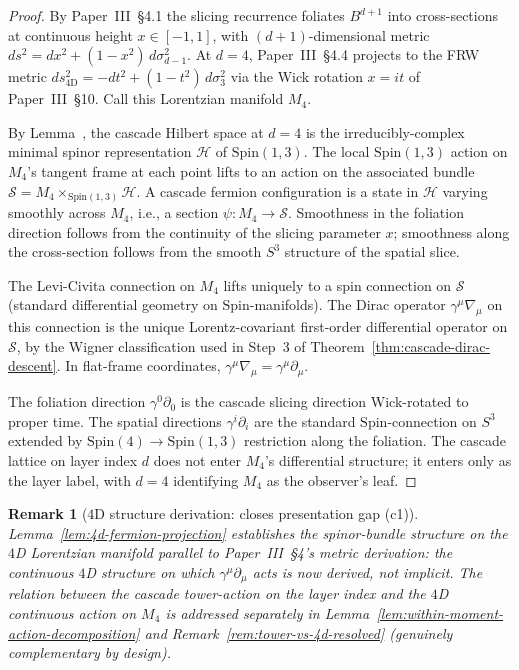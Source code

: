\documentclass[12pt,a4paper]{article}
\newtheorem*{remark}{Remark}
\begin{document}
\begin{proof}
By Paper~III~\S4.1 the slicing recurrence foliates $B^{d+1}$ into
cross-sections at continuous height $x \in [-1, 1]$, with
$(d+1)$-dimensional metric $ds^2 = dx^2 + (1-x^2)\,d\sigma_{d-1}^2$.
At $d=4$, Paper~III~\S4.4 projects to the FRW metric
$ds^2_{4\mathrm{D}} = -dt^2 + (1-t^2)\,d\sigma_3^2$ via the Wick
rotation $x = it$ of Paper~III~\S10. Call this Lorentzian manifold
$M_4$.

By Lemma~, the cascade Hilbert space
at $d=4$ is the irreducibly-complex minimal spinor representation
$\mathcal{H}$ of $\mathrm{Spin}(1,3)$. The local
$\mathrm{Spin}(1,3)$ action on $M_4$'s tangent frame at each point
lifts to an action on the associated bundle
$\mathcal{S} = M_4 \times_{\mathrm{Spin}(1,3)} \mathcal{H}$. A
cascade fermion configuration is a state in $\mathcal{H}$ varying
smoothly across $M_4$, i.e., a section
$\psi : M_4 \to \mathcal{S}$. Smoothness in the foliation direction
follows from the continuity of the slicing parameter $x$;
smoothness along the cross-section follows from the smooth $S^3$
structure of the spatial slice.

The Levi-Civita connection on $M_4$ lifts uniquely to a spin
connection on $\mathcal{S}$ (standard differential geometry on
$\mathrm{Spin}$-manifolds). The Dirac operator
$\gamma^\mu\nabla_\mu$ on this connection is the unique
Lorentz-covariant first-order differential operator on
$\mathcal{S}$, by the Wigner classification used in Step~3 of
Theorem~\ref{thm:cascade-dirac-descent}. In flat-frame coordinates,
$\gamma^\mu\nabla_\mu = \gamma^\mu\partial_\mu$.

The foliation direction $\gamma^0\partial_0$ is the cascade slicing
direction Wick-rotated to proper time. The spatial directions
$\gamma^i\partial_i$ are the standard $\mathrm{Spin}$-connection on
$S^3$ extended by $\mathrm{Spin}(4) \to \mathrm{Spin}(1,3)$
restriction along the foliation. The cascade lattice on layer
index $d$ does not enter $M_4$'s differential structure; it enters
only as the layer label, with $d=4$ identifying $M_4$ as the
observer's leaf.
\end{proof}

\begin{remark}[$4$D structure derivation: closes presentation gap (c1)]
\label{rem:c1-closed}
Lemma~\ref{lem:4d-fermion-projection} establishes the
spinor-bundle structure on the $4$D Lorentzian manifold parallel
to Paper~III~\S4's metric derivation: the continuous $4$D
structure on which $\gamma^\mu\partial_\mu$ acts is now derived,
not implicit. The relation between the cascade
\emph{tower-action} on the layer index and the $4$D continuous
action on $M_4$ is addressed separately in
Lemma~\ref{lem:within-moment-action-decomposition} and
Remark~\ref{rem:tower-vs-4d-resolved} (genuinely complementary by
design).
\end{remark}
\end{document}
